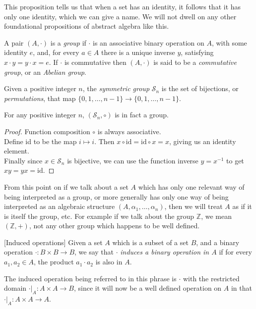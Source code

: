 This proposition tells us that when a set has an identity, it follows that it has only one identity, which we can give a name. We will not dwell on any other foundational propositions of abstract algebra like this.

\begin{define}[Group] A pair $(A, \cdot)$ is a \emph{group} if $\cdot$ is an associative binary operation on $A$, with some identity $e$, and, for every $a \in A$ there is a unique inverse $y$, satisfying $x\cdot y = y \cdot x = e$. If $\cdot$ is commutative then $(A, \cdot)$ is said to be a \emph{commutative group}, or an \emph{Abelian group}.
\end{define}

\begin{define}
	Given a positive integer $n$, the \emph{symmetric group} $\mathcal{S}_n$ is the set of bijections, or \emph{permutations}, that map $\{0,1,\dots,n-1\}\to\{0,1,\dots,n-1\}$.
\end{define}
\begin{prop}
	For any positive integer $n$, $(\mathcal{S}_n, \circ)$ is in fact a group.
\end{prop}
\begin{proof}
	Function composition $\circ$ is always associative.\\
	Define id to be the map $i \mapsto i$. Then $x \circ \text{id} = \text{id} \circ x = x$, giving us an identity element.\\
	Finally since $x \in \mathcal{S}_n$ is bijective, we can use the function inverse $y = x^{-1}$ to get $xy = yx = \text{id}$.
\end{proof}

From this point on if we talk about a set $A$ which has only one relevant way of being interpreted as a group, or more generally has only one way of being interpreted as an algebraic structure $(A, \alpha_1, \dots, \alpha_n)$, then we will treat $A$ as if it is itself the group, etc. For example if we talk about the group $\mathbb{Z}$, we mean $(\mathbb{Z}, +)$, not any other group which happens to be well defined.

\begin{define}\label{induced-subgroup}[Induced operations] Given a set $A$ which is a subset of a set $B$, and a binary operation $\cdot: B \times B \to B$, we say that $\cdot$ \emph{induces a binary operation in $A$} if for every $a_1, a_2 \in A$, the product $a_1 \cdot a_2$ is also in $A$.
\end{define}
The induced operation being referred to in this phrase is $\cdot$ with the restricted domain $\cdot|_A: A \times A \to B$, since it will now be a well defined operation on $A$ in that $\cdot|_A: A \times A \to A$.

